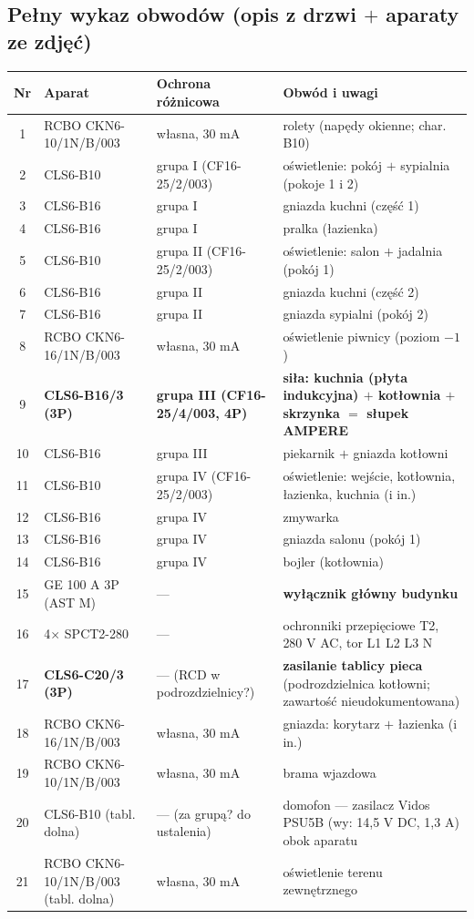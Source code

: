 \documentclass[11pt,a4paper]{article}
\begin{document}
\subsection{Pełny wykaz obwodów (opis z drzwi $+$ aparaty ze zdjęć)}
\begin{longtable}{@{}c l l p{}@{}}
\toprule
\textbf{Nr} & \textbf{Aparat} & \textbf{Ochrona różnicowa} & \textbf{Obwód i uwagi}\\
\midrule
1 & RCBO CKN6-10/1N/B/003 & własna, 30 mA & rolety (napędy okienne; char. B10)\\
2 & CLS6-B10 & grupa I (CF16-25/2/003) & oświetlenie: pokój $+$ sypialnia (pokoje 1 i 2)\\
3 & CLS6-B16 & grupa I & gniazda kuchni (część 1)\\
4 & CLS6-B16 & grupa I & pralka (łazienka)\\
5 & CLS6-B10 & grupa II (CF16-25/2/003) & oświetlenie: salon $+$ jadalnia (pokój 1)\\
6 & CLS6-B16 & grupa II & gniazda kuchni (część 2)\\
7 & CLS6-B16 & grupa II & gniazda sypialni (pokój 2)\\
8 & RCBO CKN6-16/1N/B/003 & własna, 30 mA & oświetlenie piwnicy (poziom $-1$)\\
9 & \textbf{CLS6-B16/3 (3P)} & \textbf{grupa III (CF16-25/4/003, 4P)} & \textbf{siła: kuchnia
(płyta indukcyjna) $+$ kotłownia $+$ skrzynka $=$ słupek AMPERE}\\
10 & CLS6-B16 & grupa III & piekarnik $+$ gniazda kotłowni\\
11 & CLS6-B10 & grupa IV (CF16-25/2/003) & oświetlenie: wejście, kotłownia, łazienka, kuchnia (i in.)\\
12 & CLS6-B16 & grupa IV & zmywarka\\
13 & CLS6-B16 & grupa IV & gniazda salonu (pokój 1)\\
14 & CLS6-B16 & grupa IV & bojler (kotłownia)\\
15 & GE 100 A 3P (AST M) & --- & \textbf{wyłącznik główny budynku}\\
16 & 4$\times$ SPCT2-280 & --- & ochronniki przepięciowe T2, 280 V AC, tor L1 L2 L3 N\\
17 & \textbf{CLS6-C20/3 (3P)} & --- (RCD w podrozdzielnicy?) & \textbf{zasilanie tablicy pieca}
(podrozdzielnica kotłowni; zawartość nieudokumentowana)\\
18 & RCBO CKN6-16/1N/B/003 & własna, 30 mA & gniazda: korytarz $+$ łazienka (i in.)\\
19 & RCBO CKN6-10/1N/B/003 & własna, 30 mA & brama wjazdowa\\
20 & CLS6-B10 (tabl. dolna) & --- (za grupą? do ustalenia) & domofon --- zasilacz Vidos
PSU5B (wy: 14,5 V DC, 1,3 A) obok aparatu\\
21 & RCBO CKN6-10/1N/B/003 (tabl. dolna) & własna, 30 mA & oświetlenie terenu zewnętrznego\\
\bottomrule
\end{longtable}
\end{document}

